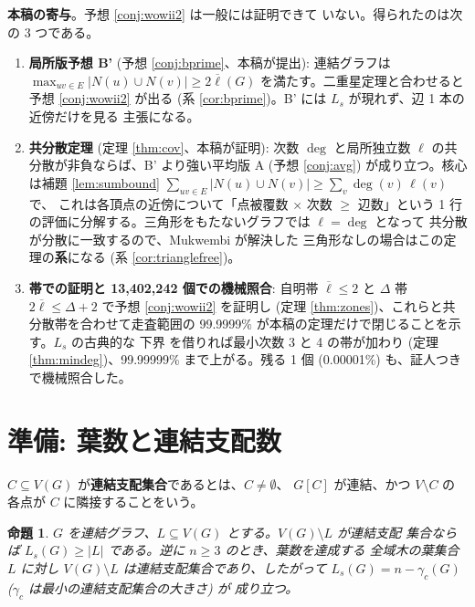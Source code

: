 \documentclass[paper=a4,fontsize=10.5pt,jafontsize=10.5pt]{jlreq}
\theoremstyle{plain}
\newtheorem{proposition}[theorem]{命題}
\theoremstyle{definition}
\begin{document}
\medskip
\noindent\textbf{本稿の寄与}。予想 \ref{conj:wowii2} は一般には証明できて
いない。得られたのは次の 3 つである。

\begin{enumerate}
\item \textbf{局所版予想 B'} (予想 \ref{conj:bprime}、本稿が提出):
  連結グラフは $\max_{uv \in E} |N(u) \cup N(v)| \ge 2\overline{\ell}(G)$
  を満たす。二重星定理と合わせると予想 \ref{conj:wowii2} が出る
  (系 \ref{cor:bprime})。B' には $L_s$ が現れず、辺 1 本の近傍だけを見る
  主張になる。
\item \textbf{共分散定理} (定理 \ref{thm:cov}、本稿が証明): 次数 $\deg$
  と局所独立数 $\ell$ の共分散が非負ならば、B' より強い平均版 A (予想
  \ref{conj:avg}) が成り立つ。核心は補題
  \ref{lem:sumbound}
  $\sum_{uv \in E} |N(u) \cup N(v)| \ge \sum_v \deg(v)\,\ell(v)$ で、
  これは各頂点の近傍について「点被覆数 $\times$ 次数 $\ge$ 辺数」という
  1 行の評価に分解する。三角形をもたないグラフでは $\ell = \deg$ となって
  共分散が分散に一致するので、Mukwembi \cite{mukwembi} が解決した
  三角形なしの場合はこの定理の\textbf{系}になる (系
  \ref{cor:trianglefree})。
\item \textbf{帯での証明と 13,402,242 個での機械照合}: 自明帯
  $\overline{\ell} \le 2$ と $\Delta$ 帯
  $2\overline{\ell} \le \Delta + 2$ で予想 \ref{conj:wowii2} を証明し
  (定理 \ref{thm:zones})、これらと共分散帯を合わせて走査範囲の
  99.9999\% が本稿の定理だけで閉じることを示す。$L_s$ の古典的な
  下界 \cite{storer,kw1991} を借りれば最小次数 3 と 4 の帯が加わり
  (定理 \ref{thm:mindeg})、99.99999\% まで上がる。残る
  1 個 (0.00001\%) も、証人つきで機械照合した。
\end{enumerate}

\section{準備: 葉数と連結支配数}\label{sec:prelim}

$C \subseteq V(G)$ が\textbf{連結支配集合}であるとは、$C \ne \emptyset$、
$G[C]$ が連結、かつ $V \setminus C$ の各点が $C$ に隣接することをいう。

\begin{proposition}\label{prop:cds}
$G$ を連結グラフ、$L \subseteq V(G)$ とする。$V(G) \setminus L$ が連結支配
集合ならば $L_s(G) \ge |L|$ である。逆に $n \ge 3$ のとき、葉数を達成する
全域木の葉集合 $L$ に対し $V(G) \setminus L$ は連結支配集合であり、したがって
$L_s(G) = n - \gamma_c(G)$ ($\gamma_c$ は最小の連結支配集合の大きさ) が
成り立つ。
\end{proposition}
\end{document}
